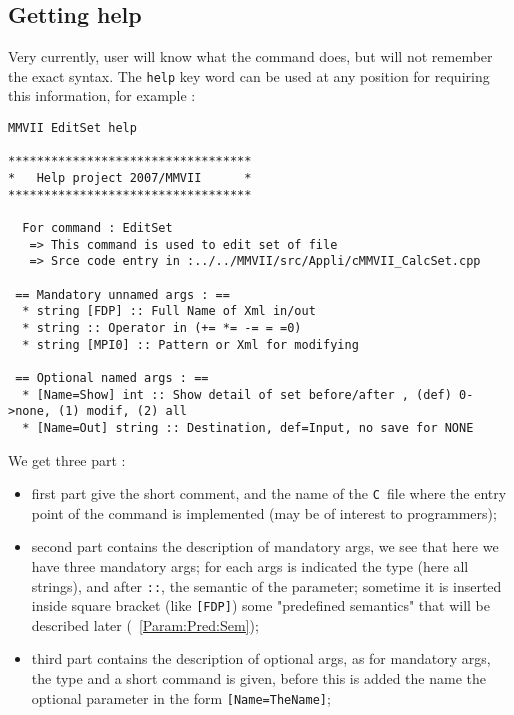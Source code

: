 \documentclass[a4paper]{book}
\newcommand{\CPP}{\mbox{\tt C\hspace{-0.05cm}\raisebox{0.2ex}{\small ++} }}
\begin{document}
\subsection{Getting help}

Very currently, user will know what the command does, but will not remember the exact syntax.
The {\tt help} key word can be used at any position for requiring this information,
for example :

\begin{verbatim}
MMVII EditSet help

**********************************
*   Help project 2007/MMVII      *
**********************************

  For command : EditSet 
   => This command is used to edit set of file
   => Srce code entry in :../../MMVII/src/Appli/cMMVII_CalcSet.cpp

 == Mandatory unnamed args : ==
  * string [FDP] :: Full Name of Xml in/out
  * string :: Operator in (+= *= -= = =0)
  * string [MPI0] :: Pattern or Xml for modifying

 == Optional named args : ==
  * [Name=Show] int :: Show detail of set before/after , (def) 0->none, (1) modif, (2) all
  * [Name=Out] string :: Destination, def=Input, no save for NONE
\end{verbatim}

We get three part :


\begin{itemize}
   \item  first part give the short comment, and the name of the \CPP file where
          the entry point of the command is implemented (may be of interest to programmers);

   \item  second part contains the description of mandatory args, we see that here we
          have three mandatory args;  for each args is indicated the type (here all strings),
          and  after {\tt ::}, the semantic of the parameter;
          sometime it is inserted  inside square bracket (like {\tt [FDP]}) some "predefined semantics"
          that will be described later (~\ref{Param:Pred:Sem});

   \item  third part contains the description of optional args, as for mandatory args, 
          the type and a short command is given, before this is added the name the optional
          parameter in the form {\tt [Name=TheName]};
\end{itemize}
\end{document}
